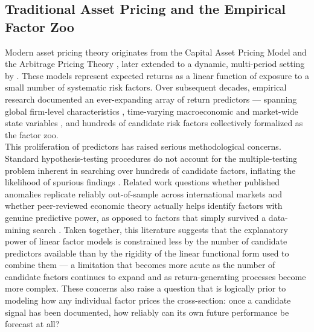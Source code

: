 \documentclass[pdflatex,sn-mathphys-num]{sn-jnl}%
\theoremstyle{thmstyleone}%
\theoremstyle{thmstyletwo}%
\theoremstyle{thmstylethree}%
\begin{document}
\subsection{Traditional Asset Pricing and the Empirical Factor Zoo}

Modern asset pricing theory originates from the Capital Asset Pricing Model \cite{sharpe1964capital} and the Arbitrage Pricing Theory \cite{ross1978current}, later extended to a dynamic, multi-period setting by \cite{merton1973intertemporal}. These models represent expected returns as a linear function of exposure to a small number of systematic risk factors. Over subsequent decades, empirical research documented an ever-expanding array of return predictors — spanning global firm-level characteristics \cite{jensen2023there}, time-varying macroeconomic and market-wide state variables \cite{farmer2023pockets}, and hundreds of candidate risk factors collectively formalized as the factor zoo\cite{feng2020taming}.\\

This proliferation of predictors has raised serious methodological concerns. Standard hypothesis-testing procedures do not account for the multiple-testing problem inherent in searching over hundreds of candidate factors, inflating the likelihood of spurious findings \cite{harvey2016and, chen2025t}. Related work questions whether published anomalies replicate reliably out-of-sample across international markets\cite{jensen2023there} and whether peer-reviewed economic theory actually helps identify factors with genuine predictive power, as opposed to factors that simply survived a data-mining search \cite{chen2023does} . Taken together, this literature suggests that the explanatory power of linear factor models is constrained less by the number of candidate predictors available than by the rigidity of the linear functional form used to combine them — a limitation that becomes more acute as the number of candidate factors continues to expand and as return-generating processes become more complex. These concerns also raise a question that is logically prior to modeling how any individual factor prices the cross-section: once a candidate signal has been documented, how reliably can its own future performance be forecast at all?\\
\end{document}
